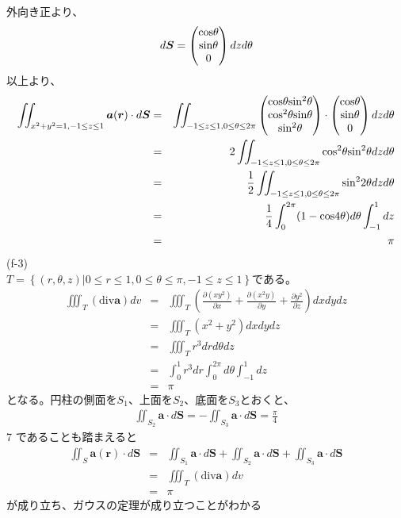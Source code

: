 \documentclass[pdflatex,ja=standard,fleqn]{bxjsarticle}
\begin{document}
外向き正より、
\begin{eqnarray*}
    d\boldsymbol{S}=\begin{pmatrix}{\rm cos}\theta\\{\rm sin}\theta\\0\end{pmatrix}dzd\theta
\end{eqnarray*}
以上より、
\begin{eqnarray*}
    \iint_{x^2+y^2=1,-1\leq z\leq1} \boldsymbol{a}(\boldsymbol{r})\cdot d\boldsymbol{S}&=&\iint_{-1\leq z\leq 1,0\leq\theta\leq 2\pi} \begin{pmatrix}{\rm cos}\theta{\rm sin^2}\theta\\{\rm cos^2}\theta{\rm sin}\theta\\{\rm sin^2}\theta\end{pmatrix}\cdot\begin{pmatrix}{\rm cos}\theta\\{\rm sin}\theta\\0\end{pmatrix}dzd\theta\\
    &=&2\iint_{-1\leq z\leq 1,0\leq\theta\leq 2\pi} {\rm cos^2}\theta{\rm sin^2}\theta dzd\theta\\
    &=&\frac{1}{2}\iint_{-1\leq z\leq 1,0\leq\theta\leq 2\pi} {\rm sin^2}2\theta dzd\theta\\
    &=&\frac{1}{4}\int_{0}^{2\pi} (1-{\rm cos}4\theta)d\theta\int_{-1}^{1} dz\\
    &=&\pi
\end{eqnarray*}
(f-3)\\
$T=\left\{(r,\theta,z)|0\leq r\leq 1,0\leq \theta\leq\pi,-1\leq z\leq 1\right\}$である。
\begin{eqnarray*}
    \iiint_T (\mathrm{div}\boldsymbol{a})dv&=&\iiint_T \left(\frac{\partial (xy^2)}{\partial x}+\frac{\partial (x^2y)}{\partial y}+\frac{\partial y^2}{\partial z}\right)dxdydz\\
    &=&\iiint_T (x^2+y^2)dxdydz\\
    &=&\iiint_T r^3drd\theta dz\\
    &=&\int_{0}^{1} r^3dr\int_{0}^{2\pi} d\theta\int_{-1}^{1} dz\\
    &=&\pi
\end{eqnarray*}
となる。円柱の側面を$S_{1}$、上面を$S_{2}$、底面を$S_{3}$とおくと、
\begin{eqnarray*}
    \iint_{S_{2}} \boldsymbol{a}\cdot d\boldsymbol{S}=-\iint_{S_{3}} \boldsymbol{a}\cdot d\boldsymbol{S}=\frac{\pi}{4}
\end{eqnarray*}7
であることも踏まえると
\begin{eqnarray*}
    \iint_S \boldsymbol{a}(\boldsymbol{r})\cdot d\boldsymbol{S}&=&\iint_{S_{1}} \boldsymbol{a}\cdot d\boldsymbol{S}+\iint_{S_{2}} \boldsymbol{a}\cdot d\boldsymbol{S}+\iint_{S_{3}} \boldsymbol{a}\cdot d\boldsymbol{S}\\
    &=&\iiint_T (\mathrm{div}\boldsymbol{a})dv\\
    &=&\pi
\end{eqnarray*}
が成り立ち、ガウスの定理が成り立つことがわかる
\end{document}
